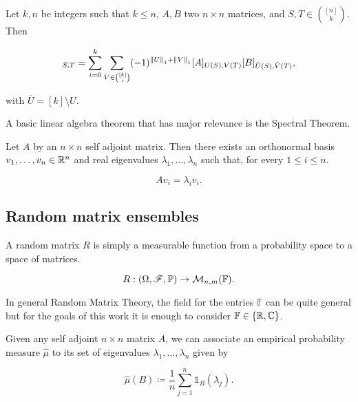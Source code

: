 \begin{theorem} \label{thm:marcus_binet}
    Let $k,n$ be integers such that $k\le n$, $A,B$ two $n\times n$ matrices, and $S,T \in \binom{[n]}{k}$. Then
    
    \begin{equation*}
        [A+B]_{S,T} = \sum_{i=0}^k \sum_{V \in \binom{[k]}{i}} (-1)^{\norm{U}_1 + \norm{V}_1} [A]_{U(S),V(T)}[B]_{\bar{U}(S),\bar{V}(T)},
    \end{equation*}

    \noindent with $\overline U = [k] \setminus U$.
\end{theorem}

A basic linear algebra theorem that has major relevance is the Spectral Theorem.

\begin{theorem}
    Let $A$ by an $n\times n$ self adjoint matrix. Then there exists an orthonormal basis $v_1, \dots, v_n \in \mathbb R^n$ and real eigenvalues $\lambda_1, \dots, \lambda_n$ such that, for every $1 \le i \le n$. 

    \begin{equation*}
        A v_i = \lambda_i v_i.
    \end{equation*}
\end{theorem}


\subsection{Random matrix ensembles}

A random matrix $R$ is simply a measurable function from a probability space to a space of matrices.

\begin{equation*}
    R: (\Omega,\mathscr F, \mathbb P) \to \mathcal M_{n,m}(\mathbb F).
\end{equation*}

In general Random Matrix Theory, the field for the entries $\mathbb F$ can be quite general but for the goals of this work it is enough to consider $\mathbb F \in \{\mathbb R, \mathbb C\}$. 

Given any self adjoint $n\times n$ matrix $A$, we can associate an empirical probability measure $\hat\mu$ to its set of eigenvalues $\lambda_1, \dots, \lambda_n$ given by

\begin{equation*}
    \hat\mu( B ) \coloneqq \frac1n \sum_{j=1}^n \mathds 1_B(\lambda_j).
\end{equation*}

